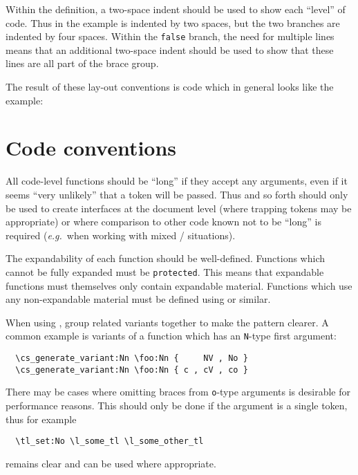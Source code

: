 \documentclass{l3doc}
\begin{document}
Within the definition, a two-space indent should be used to show each
\enquote{level} of code. Thus in the example  is
indented by two spaces, but the two branches are indented by four
spaces. Within the \texttt{false} branch, the need for multiple lines
means that an additional two-space indent should be used to show that
these lines are all part of the brace group.

The result of these lay-out conventions is code which in general
looks like the example:

\section{Code conventions}

All code-level functions should be \enquote{long} if they accept any
arguments, even if it seems \enquote{very unlikely} that a  token
will be passed. Thus  and so forth should only be used
to create interfaces at the document level (where trapping  tokens
may be appropriate) or where comparison to other code known not to be
\enquote{long} is required (\emph{e.g.}~when working with mixed
\LaTeXe{}/ situations).

The expandability of each function should be well-defined. Functions which
cannot be fully expanded must be \texttt{protected}. This means that expandable
functions must themselves only contain expandable material. Functions which
use any non-expandable material must be defined using 
or similar.

When using , group related variants together
to make the pattern clearer. A common example is variants of a function
which has an \texttt{N}-type first argument:
\begin{verbatim}
  \cs_generate_variant:Nn \foo:Nn {     NV , No }
  \cs_generate_variant:Nn \foo:Nn { c , cV , co }
\end{verbatim}

There may be cases where omitting braces from \texttt{o}-type arguments
is desirable for performance reasons. This should only be done if the
argument is a single token, thus for example
\begin{verbatim}
  \tl_set:No \l_some_tl \l_some_other_tl
\end{verbatim}
remains clear and can be used where appropriate.
\end{document}

